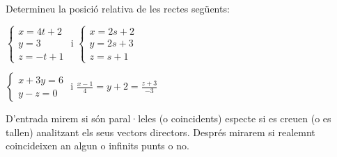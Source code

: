 \Exercise Determineu la posició relativa de les rectes següents:

\begin{llista}
  \item $\begin{cases}x=4t+2\\y=3\\z=-t+1\end{cases}$ i $\begin{cases}x=2s+2\\y=2s+3\\z=s+1\end{cases}$
  \item $\begin{cases}x+3y=6\\y-z=0\end{cases}$ i $\frac{x-1}{4}=y+2=\frac{z+3}{-3}$
\end{llista}

\Answer D'entrada mirem si són paral·leles (o coincidents) especte si es creuen (o es tallen) analitzant els seus vectors directors. Després mirarem si realemnt coincideixen an algun o infinits punts o no.

